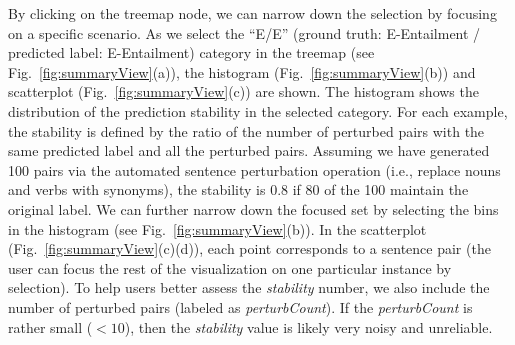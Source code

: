 By clicking on the treemap node, we can narrow down the selection by focusing on a specific scenario.
As we select the ``E/E'' (ground truth: E-Entailment / predicted label: E-Entailment) category in the treemap (see Fig.~\ref{fig:summaryView}(a)), the histogram (Fig.~\ref{fig:summaryView}(b)) and scatterplot  (Fig.~\ref{fig:summaryView}(c)) are shown. The histogram shows the distribution of the prediction stability in the selected category. For each example, the stability is defined by the ratio of the number of perturbed pairs with the same predicted label and all the perturbed pairs. Assuming we have generated 100 pairs via the automated sentence perturbation operation (i.e., replace nouns and verbs with synonyms), the stability is 0.8 if 80 of the 100 maintain the original label. 
%
We can further narrow down the focused set by selecting the bins in the histogram (see Fig.~\ref{fig:summaryView}(b)).
%
In the scatterplot (Fig.~\ref{fig:summaryView}(c)(d)), each point corresponds to a sentence pair (the user can focus the rest of the visualization on one particular instance by selection). To help users better assess the \emph{stability} number, we also include the number of perturbed pairs (labeled as \emph{perturbCount}). If the \emph{perturbCount} is rather small ($<10$), then the \emph{stability} value is likely very noisy and unreliable. %



